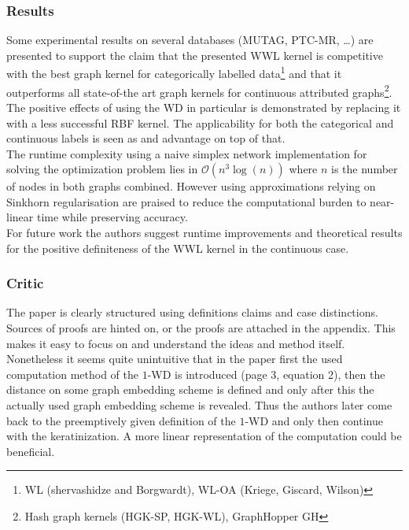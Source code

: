 \documentclass[twoside,twocolumn]{scrartcl}
\begin{document}
\subsubsection{Results}
Some experimental results on several databases (MUTAG, PTC-MR, \dots) are presented to support the claim that the presented WWL kernel is competitive with the best graph kernel for categorically labelled data\footnote{WL (shervashidze and Borgwardt), WL-OA (Kriege, Giscard, Wilson)} and that it outperforms all state-of-the art graph kernels for continuous attributed graphs\footnote{Hash graph kernels (HGK-SP, HGK-WL), GraphHopper GH}.\\
The positive effects of using the WD in particular is demonstrated by replacing it with a less successful RBF kernel. The applicability for both the categorical and continuous labels is seen as and advantage on top of that.\\

The runtime complexity using a naive simplex network implementation for solving the optimization problem lies in $\mathcal{O}(n^3 \log(n))$ where $n$ is the number of nodes in both graphs combined. However using approximations relying on Sinkhorn regularisation are praised to reduce the computational burden to near-linear time while preserving accuracy.\\

For future work the authors suggest runtime improvements and theoretical results for the positive definiteness of the WWL kernel in the continuous case.

\subsubsection{Critic}
The paper is clearly structured using definitions claims and case distinctions. Sources of proofs are hinted on, or the proofs are attached in the appendix. This makes it easy to focus on and understand the ideas and method itself. Nonetheless it seems quite unintuitive that in  the paper first the used computation method of the $1$-WD is introduced (page 3, equation 2), then the distance on some graph embedding scheme is defined and only after this the actually used graph embedding scheme is revealed. Thus the authors later come back to the preemptively given definition of the $1$-WD and only then continue with the keratinization. A more linear representation of the computation could be beneficial.\\
\end{document}
